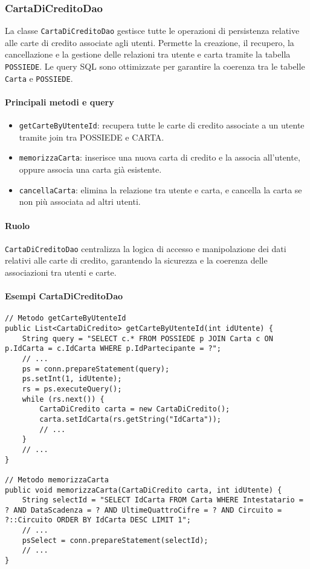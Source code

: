 \subsubsection{CartaDiCreditoDao}
La classe \texttt{CartaDiCreditoDao} gestisce tutte le operazioni di persistenza relative alle carte di credito associate agli utenti. Permette la creazione, il recupero, la cancellazione e la gestione delle relazioni tra utente e carta tramite la tabella \texttt{POSSIEDE}. Le query SQL sono ottimizzate per garantire la coerenza tra le tabelle \texttt{Carta} e \texttt{POSSIEDE}.

\paragraph{Principali metodi e query}
\begin{itemize}
    \item \texttt{getCarteByUtenteId}: recupera tutte le carte di credito associate a un utente tramite join tra POSSIEDE e CARTA.
    \item \texttt{memorizzaCarta}: inserisce una nuova carta di credito e la associa all'utente, oppure associa una carta già esistente.
    \item \texttt{cancellaCarta}: elimina la relazione tra utente e carta, e cancella la carta se non più associata ad altri utenti.
\end{itemize}

\paragraph{Ruolo}
\texttt{CartaDiCreditoDao} centralizza la logica di accesso e manipolazione dei dati relativi alle carte di credito, garantendo la sicurezza e la coerenza delle associazioni tra utenti e carte.

\paragraph{Esempi CartaDiCreditoDao}
\begin{verbatim}
// Metodo getCarteByUtenteId
public List<CartaDiCredito> getCarteByUtenteId(int idUtente) {
    String query = "SELECT c.* FROM POSSIEDE p JOIN Carta c ON p.IdCarta = c.IdCarta WHERE p.IdPartecipante = ?";
    // ...
    ps = conn.prepareStatement(query);
    ps.setInt(1, idUtente);
    rs = ps.executeQuery();
    while (rs.next()) {
        CartaDiCredito carta = new CartaDiCredito();
        carta.setIdCarta(rs.getString("IdCarta"));
        // ...
    }
    // ...
}

// Metodo memorizzaCarta
public void memorizzaCarta(CartaDiCredito carta, int idUtente) {
    String selectId = "SELECT IdCarta FROM Carta WHERE Intestatario = ? AND DataScadenza = ? AND UltimeQuattroCifre = ? AND Circuito = ?::Circuito ORDER BY IdCarta DESC LIMIT 1";
    // ...
    psSelect = conn.prepareStatement(selectId);
    // ...
}
\end{verbatim}

